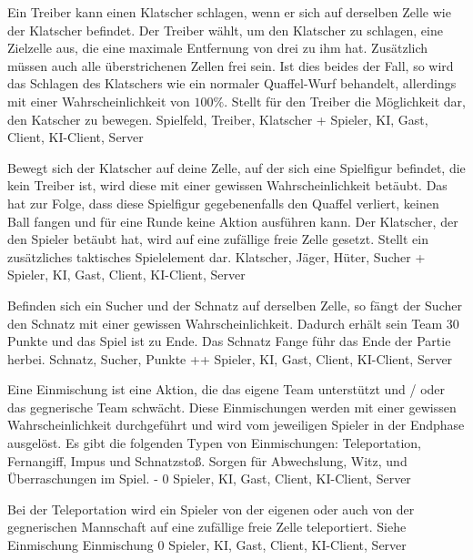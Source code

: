         {Ein Treiber kann einen Klatscher schlagen, wenn er sich auf derselben Zelle wie der Klatscher befindet. Der Treiber wählt, um den Klatscher zu schlagen, eine Zielzelle aus, die eine maximale Entfernung von drei zu ihm hat. Zusätzlich müssen auch alle überstrichenen Zellen frei sein. Ist dies beides der Fall, so wird das Schlagen des Klatschers wie ein normaler Quaffel-Wurf behandelt, allerdings mit einer Wahrscheinlichkeit von $100\%$.}
        {Stellt für den Treiber die Möglichkeit dar, den Katscher zu bewegen.}
        {Spielfeld, Treiber, Klatscher}
        {+}
        {Spieler, KI, Gast, Client, KI-Client, Server}
        
        {Bewegt sich der Klatscher auf deine Zelle, auf der sich eine Spielfigur befindet, die kein Treiber ist, wird diese mit einer gewissen Wahrscheinlichkeit betäubt. Das hat zur Folge, dass diese Spielfigur gegebenenfalls den Quaffel verliert, keinen Ball fangen und für eine Runde keine Aktion ausführen kann. Der Klatscher, der den Spieler betäubt hat, wird auf eine zufällige freie Zelle gesetzt.}
        {Stellt ein zusätzliches taktisches Spielelement dar.}
        {Klatscher, Jäger, Hüter, Sucher}
        {+}
        {Spieler, KI, Gast, Client, KI-Client, Server}
        
        {Befinden sich ein Sucher und der Schnatz auf derselben Zelle, so fängt der Sucher den Schnatz mit einer gewissen Wahrscheinlichkeit. Dadurch erhält sein Team 30 Punkte und das Spiel ist zu Ende.}
        {Das Schnatz Fange führ das Ende der Partie herbei.}
        {Schnatz, Sucher, Punkte}
        {++}
        {Spieler, KI, Gast, Client, KI-Client, Server}
        

        {Eine  Einmischung ist eine Aktion, die das eigene Team unterstützt und / oder das gegnerische Team schwächt. Diese Einmischungen werden mit einer gewissen Wahrscheinlichkeit durchgeführt und wird vom jeweiligen Spieler in der Endphase ausgelöst. Es gibt die folgenden Typen von Einmischungen: Teleportation, Fernangiff, Impus und Schnatzstoß.}
        {Sorgen für Abwechslung, Witz, und Überraschungen im Spiel.}
        {-}
        {0}
        {Spieler, KI, Gast, Client, KI-Client, Server}

        {Bei der Teleportation wird ein Spieler von der eigenen oder auch von der gegnerischen Mannschaft auf eine zufällige freie Zelle teleportiert.}
        {Siehe Einmischung}
        {Einmischung}
        {0}
        {Spieler, KI, Gast, Client, KI-Client, Server}

